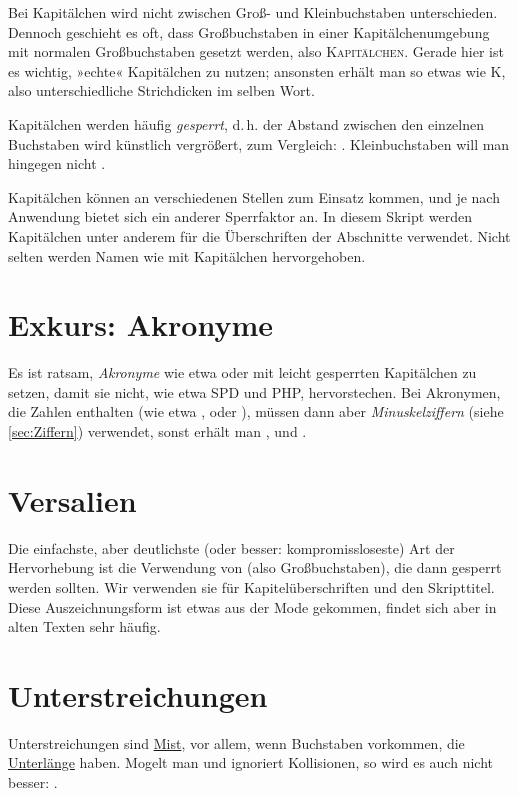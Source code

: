 Bei Kapitälchen wird nicht zwischen Groß- und Kleinbuchstaben
unterschieden. Dennoch geschieht es oft, dass Großbuchstaben in einer
Kapitälchenumgebung mit normalen Großbuchstaben gesetzt werden, also
\textsc{Kapitälchen}. Gerade hier ist es wichtig, »echte« Kapitälchen zu
nutzen; ansonsten erhält man so etwas wie K, also
unterschiedliche Strichdicken im selben Wort.

Kapitälchen werden häufig \emph{gesperrt}, d.\,h. der Abstand zwischen den
einzelnen Buchstaben wird künstlich vergrößert, zum Vergleich:
. Kleinbuchstaben will man hingegen nicht
.

Kapitälchen können an verschiedenen Stellen zum Einsatz kommen, und je nach
Anwendung bietet sich ein anderer Sperrfaktor an. In diesem Skript werden
Kapitälchen unter anderem für die Überschriften der Abschnitte verwendet. Nicht
selten werden Namen wie  mit
Kapitälchen hervorgehoben.

\section{Exkurs: Akronyme}

Es ist ratsam, \emph{Akronyme} wie etwa  oder  mit leicht
gesperrten Kapitälchen zu setzen, damit sie nicht, wie etwa SPD und PHP,
hervorstechen. Bei Akronymen, die Zahlen enthalten (wie etwa ,
 oder ), müssen dann aber
\emph{Minuskelziffern} (siehe \cref{sec:Ziffern}) verwendet, sonst erhält man
,  und
.

\section{Versalien}

Die einfachste, aber deutlichste (oder besser: kompromissloseste) Art
der Hervorhebung ist die Verwendung von  (also
Großbuchstaben), die dann gesperrt werden sollten. Wir verwenden sie für
Kapitelüberschriften und den Skripttitel.  Diese Auszeichnungsform ist etwas aus
der Mode gekommen, findet sich aber in alten Texten sehr häufig.

\section{Unterstreichungen}

Unterstreichungen sind \underline{Mist}, vor allem, wenn Buchstaben vorkommen,
die \underline{Unterlänge} haben. Mogelt man und ignoriert Kollisionen, so wird
es auch nicht besser: \underline{}.



